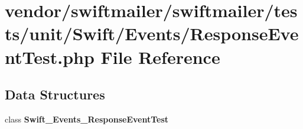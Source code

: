 \section{vendor/swiftmailer/swiftmailer/tests/unit/\+Swift/\+Events/\+Response\+Event\+Test.php File Reference}
\label{_response_event_test_8php}
\subsection*{Data Structures}
\begin{DoxyCompactItemize}
\item 
class {\bf Swift\+\_\+\+Events\+\_\+\+Response\+Event\+Test}
\end{DoxyCompactItemize}
